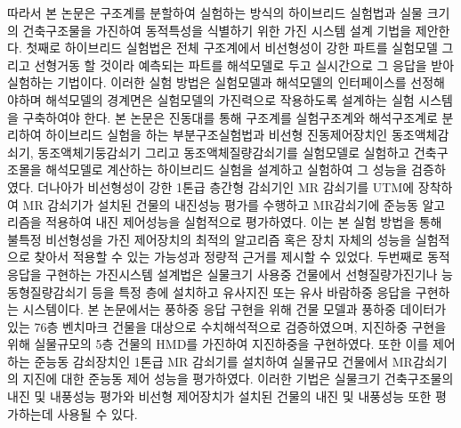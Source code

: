 따라서 본 논문은 구조계를 분할하여 실험하는 방식의 하이브리드 실험법과 실물 크기의 건축구조물을 가진하여 동적특성을 식별하기 위한 가진 시스템 설계 기법을 제안한다. 첫째로 하이브리드 실험법은 전체 구조계에서 비선형성이 강한 파트를 실험모델 그리고 선형거동 할 것이라 예측되는 파트를 해석모델로 두고 실시간으로 그 응답을 받아 실험하는 기법이다. 이러한 실험 방법은 실험모델과 해석모델의 인터페이스를 선정해야하며 해석모델의 경계면은 실험모델의 가진력으로 작용하도록 설계하는 실험 시스템을 구축하여야 한다. 본 논문은 진동대를 통해 구조계를 실험구조계와 해석구조계로 분리하여 하이브리드 실험을 하는 부분구조실험법과 비선형 진동제어장치인 동조액체감쇠기, 동조액체기둥감쇠기 그리고 동조액체질량감쇠기를 실험모델로 실험하고 건축구조몰을 해석모델로 계산하는 하이브리드 실험을 설계하고 실험하여 그 성능을 검증하였다. 더나아가 비선형성이 강한 1톤급 층간형 감쇠기인 MR 감쇠기를 UTM에 장착하여 MR 감쇠기가 설치된 건물의 내진성능 평가를 수행하고 MR감쇠기에 준능동 알고리즘을 적용하여 내진 제어성능을 실험적으로 평가하였다. 이는 본 실험 방법을 통해 불특정 비선형성을 가진 제어장치의 최적의 알고리즘 혹은 장치 자체의 성능을 실험적으로 찾아서 적용할 수 있는 가능성과 정량적 근거를 제시할 수 있었다. 두번째로 동적 응답을 구현하는 가진시스템 설계법은 실물크기 사용중 건물에서 선형질량가진기나 능동형질량감쇠기 등을 특정 층에 설치하고 유사지진 또는 유사 바람하중 응답을 구현하는 시스템이다. 본 논문에서는 풍하중 응답 구현을 위해 건물 모델과 풍하중 데이터가 있는 76층 벤치마크 건물을 대상으로 수치해석적으로 검증하였으며, 지진하중 구현을 위해 실물규모의 5층 건물의 HMD를 가진하여 지진하중을 구현하였다. 또한 이를 제어하는 준능동 감쇠장치인 1톤급 MR 감쇠기를 설치하여 실물규모 건물에서 MR감쇠기의 지진에 대한 준능동 제어 성능을 평가하였다. 이러한 기법은 실물크기 건축구조물의 내진 및 내풍성능 평가와 비선형 제어장치가 설치된 건물의 내진 및 내풍성능 또한 평가하는데 사용될 수 있다.
